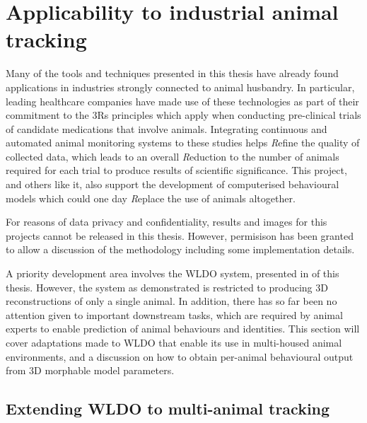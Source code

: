 \section{Applicability to industrial animal tracking}

Many of the tools and techniques presented in this thesis have already found applications in industries strongly connected to animal husbandry. In particular, leading healthcare companies have made use of these technologies as part of their commitment to the 3Rs principles which apply when conducting pre-clinical trials of candidate medications that involve animals. Integrating continuous and automated animal monitoring systems to these studies helps \emph{R}efine the quality of collected data, which leads to an overall \emph{R}eduction to the number of animals required for each trial to produce results of scientific significance. This project, and others like it, also support the development of computerised behavioural models which could one day \emph{R}eplace the use of animals altogether.

For reasons of data privacy and confidentiality, results and images for this projects cannot be released in this thesis. However, permisison has been granted to allow a discussion of the methodology including some implementation details. 

A priority development area involves the WLDO system, presented in  of this thesis. However, the system as demonstrated is restricted to producing 3D reconstructions of only a single animal. In addition, there has so far been no attention given to important downstream tasks, which are required by animal experts to enable prediction of animal behaviours and identities. This section will cover adaptations made to WLDO that enable its use in multi-housed animal environments, and a discussion on how to obtain per-animal behavioural output from 3D morphable model parameters.


 \subsection{Extending WLDO to multi-animal tracking}
 
